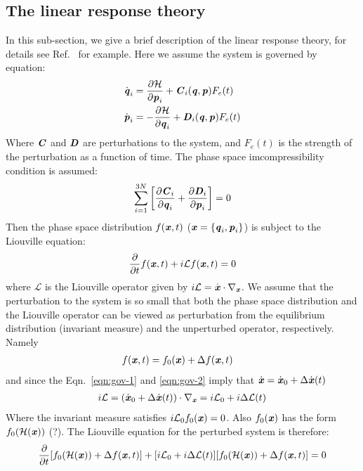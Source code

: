 \documentclass[aip,jcp,a4paper,reprint,onecolumn]{revtex4-1}
\newcommand{\vect}[1]{\textbf{\textit{#1}}}
\newcommand{\mh}{\mathcal H}
\newcommand{\ml}{\mathcal L}
\begin{document}
\subsection{The linear response theory}
In this sub-section, we give a brief description of the linear response
theory, for details see Ref.~\cite{tuckeman2010statistical} for
example. Here we assume the system is governed by equation:
\begin{align}\label{eqn:gov-1}
  \dot{\vect q}_i & = \frac{\partial\mh}{\partial \vect p_i}
  + \vect C_i(\vect q,\vect p) F_e(t)\\\label{eqn:gov-2}
  \dot{\vect p}_i & =- \frac{\partial\mh}{\partial \vect q_i}
  + \vect D_i(\vect q,\vect p) F_e(t)
\end{align}
Where $\vect C$ and $\vect D$ are perturbations to the system, and
$F_e(t)$ is the strength of the perturbation as a function of time.
The phase space imcompressibility condition is assumed:
\begin{align}
  \sum_{i=1}^{3N}
  \bigg[
  \frac{\partial \vect C_i}{\partial \vect q_i} +
  \frac{\partial \vect D_i}{\partial \vect p_i}
  \bigg] = 0
\end{align}
Then the phase space distribution $f(\vect x, t)$ ($\vect x = \{\vect
q_i, \vect p_i\}$) is subject to the Liouville equation:
\begin{align}
  \frac{\partial}{\partial t} f(\vect x, t) + i\ml f(\vect x, t) = 0
\end{align}
where $\ml$ is the Liouville operator given by $i\ml = \dot{\vect
  x}\cdot\nabla_{\vect x}$.  We assume that the perturbation to the
system is so small that both the phase space distribution and the
Liouville operator can be viewed as perturbation from the equilibrium
distribution (invariant measure) and the unperturbed operator,
respectively. Namely
\begin{align}
  f(\vect x, t) &= f_0(\vect x) + \Delta  f(\vect x, t)
\end{align}
and since the Eqn.~\eqref{eqn:gov-1} and \eqref{eqn:gov-2} imply that
$\dot{\vect x} = \dot{\vect x}_0 + \Delta \dot{\vect x}(t)$
\begin{align}
  i\ml =
  (\dot{\vect x}_0 + \Delta \dot{\vect x}(t))\cdot\nabla_{\vect x}
  = i\ml_0 + i\Delta\ml(t)
\end{align}
Where the invariant measure satisfies $i\ml_0f_0(\vect x) = 0$. Also
$f_0(\vect x)$ has the form $f_0(\mh(\vect x))$ (?). The Liouville equation
for the perturbed system is therefore:
\begin{align}
  \frac{\partial}{\partial t}
  [f_0(\mh(\vect x)) + \Delta  f(\vect x, t)]
  +
  [i\ml_0 + i\Delta\ml(t)]
  [f_0(\mh(\vect x)) + \Delta  f(\vect x, t)] = 0
\end{align}
\end{document}
